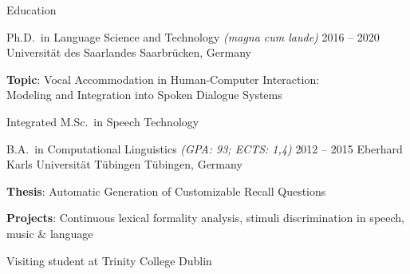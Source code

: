 \documentclass{resume} %
\begin{document}
\begin{rSection}{Education}

\begin{rSubsection}
	{Ph.D.\ in Language Science and Technology \footnotesize{\textit{(magna cum laude)}}}
	{2016 -- 2020}
	{Universität des Saarlandes}
	{Saarbrücken, Germany} %
	
	\setlength{\itemindent}{.7cm}
		
	\item \textbf{Topic}: Vocal Accommodation in Human-Computer Interaction:\\\hspace*{2.05cm}Modeling and Integration into Spoken Dialogue Systems %
	\item Integrated M.Sc.\ in Speech Technology
\end{rSubsection}

%	
%	

\begin{rSubsection}
	{B.A.\ in Computational Linguistics \footnotesize{\textit{(GPA: 93; ECTS: 1,4)}}}
	{2012 -- 2015}
	{Eberhard Karls Universität Tübingen}
	{Tübingen, Germany}

	\setlength{\itemindent}{.7cm}
	
	\item \textbf{Thesis}: Automatic Generation of Customizable Recall Questions
	\item \textbf{Projects}: Continuous lexical formality analysis, stimuli discrimination in speech, music \& language
	\item Visiting student at Trinity College Dublin 
\end{rSubsection}

\end{rSection}
\end{document}
